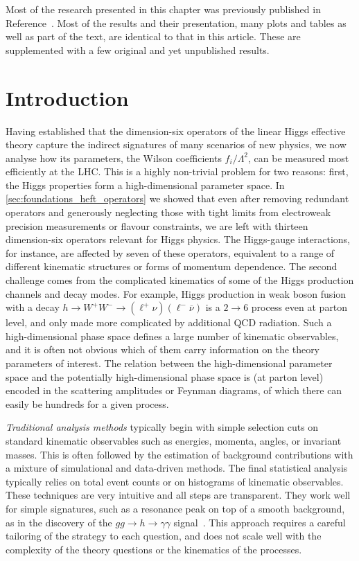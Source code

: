 Most of the research presented in this chapter was previously
published in Reference~\cite{Brehmer:2016nyr}. Most of the results and
their presentation, many plots and tables as well as part of the text,
are identical to that in this article. These are supplemented with a
few original and yet unpublished results.



\section{Introduction}
\label{sec:information_intro}

Having established that the dimension-six operators of the linear
Higgs effective theory capture the indirect signatures of many
scenarios of new physics, we now analyse how its parameters, the
Wilson coefficients $f_i/\Lambda^2$, can be measured most efficiently
at the LHC. This is a highly non-trivial problem for two reasons:
first, the Higgs properties form a high-dimensional parameter
space. In \autoref{sec:foundations_heft_operators} we showed that even
after removing redundant operators and generously neglecting those
with tight limits from electroweak precision measurements or flavour
constraints, we are left with thirteen dimension-six operators
relevant for Higgs physics. The Higgs-gauge interactions, for
instance, are affected by seven of these operators, equivalent to a
range of different kinematic structures or forms of momentum
dependence. The second challenge comes from the complicated kinematics
of some of the Higgs production channels and decay modes. For example,
Higgs production in weak boson fusion with a decay
$h \to W^+W^- \to (\ell^+ \nu) (\ell^- \overbar{\nu})$ is a $2 \to 6$
process even at parton level, and only made more complicated by
additional QCD radiation. Such a high-dimensional phase space defines
a large number of kinematic observables, and it is often not obvious
which of them carry information on the theory parameters of
interest. The relation between the high-dimensional parameter space
and the potentially high-dimensional phase space is (at parton level)
encoded in the scattering amplitudes or Feynman diagrams, of which
there can easily be hundreds for a given process.

\emph{Traditional analysis methods} typically begin with simple
selection cuts on standard kinematic observables such as energies,
momenta, angles, or invariant masses. This is often followed by the
estimation of background contributions with a mixture of simulational
and data-driven methods. The final statistical analysis typically
relies on total event counts or on histograms of kinematic
observables.  These techniques are very intuitive and all steps are
transparent. They work well for simple signatures, such as a
resonance peak on top of a smooth background, as in the discovery of
the $gg \to h \to \gamma \gamma$
signal~\cite{Aad:2012tfa,Chatrchyan:2012xdj}. This approach requires a
careful tailoring of the strategy to each question, and does not scale
well with the complexity of the theory questions or the kinematics of
the processes.

